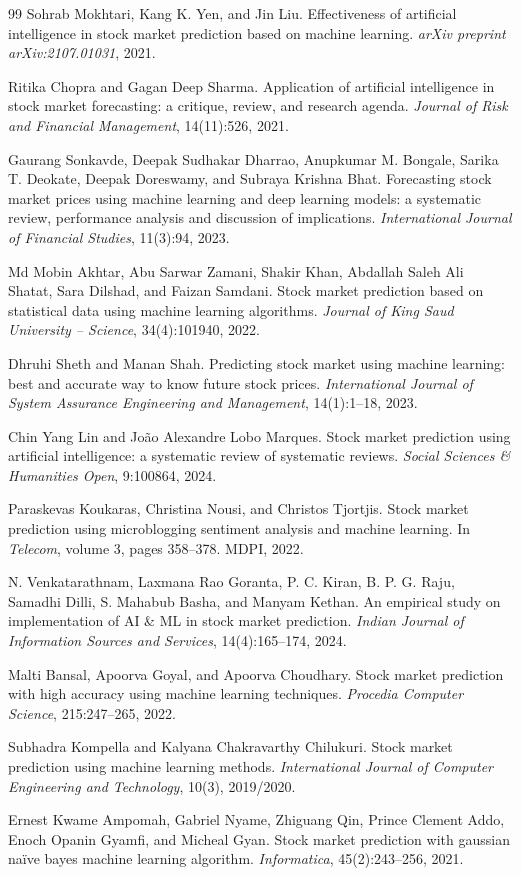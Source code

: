 \documentclass[11pt,a4paper]{article}
\begin{document}
\begin{thebibliography}{99}
 Sohrab Mokhtari, Kang K. Yen, and Jin Liu. Effectiveness of artificial
intelligence in stock market prediction based on machine learning. \textit{arXiv preprint
arXiv:2107.01031}, 2021.

 Ritika Chopra and Gagan Deep Sharma. Application of artificial intelligence in
stock market forecasting: a critique, review, and research agenda. \textit{Journal of Risk and
Financial Management}, 14(11):526, 2021.

 Gaurang Sonkavde, Deepak Sudhakar Dharrao, Anupkumar M. Bongale,
Sarika T. Deokate, Deepak Doreswamy, and Subraya Krishna Bhat. Forecasting stock market prices
using machine learning and deep learning models: a systematic review, performance analysis and
discussion of implications. \textit{International Journal of Financial Studies}, 11(3):94, 2023.

 Md Mobin Akhtar, Abu Sarwar Zamani, Shakir Khan, Abdallah Saleh Ali Shatat,
Sara Dilshad, and Faizan Samdani. Stock market prediction based on statistical data using machine
learning algorithms. \textit{Journal of King Saud University -- Science}, 34(4):101940, 2022.

 Dhruhi Sheth and Manan Shah. Predicting stock market using machine learning:
best and accurate way to know future stock prices. \textit{International Journal of System Assurance
Engineering and Management}, 14(1):1--18, 2023.

 Chin Yang Lin and Jo\~ao Alexandre Lobo Marques. Stock market prediction using
artificial intelligence: a systematic review of systematic reviews. \textit{Social Sciences \& Humanities
Open}, 9:100864, 2024.

 Paraskevas Koukaras, Christina Nousi, and Christos Tjortjis. Stock market
prediction using microblogging sentiment analysis and machine learning. In \textit{Telecom}, volume
3, pages 358--378. MDPI, 2022.

 N. Venkatarathnam, Laxmana Rao Goranta, P. C. Kiran, B. P. G. Raju,
Samadhi Dilli, S. Mahabub Basha, and Manyam Kethan. An empirical study on implementation of AI
\& ML in stock market prediction. \textit{Indian Journal of Information Sources and Services},
14(4):165--174, 2024.

 Malti Bansal, Apoorva Goyal, and Apoorva Choudhary. Stock market prediction
with high accuracy using machine learning techniques. \textit{Procedia Computer Science},
215:247--265, 2022.

 Subhadra Kompella and Kalyana Chakravarthy Chilukuri. Stock market
prediction using machine learning methods. \textit{International Journal of Computer Engineering
and Technology}, 10(3), 2019/2020.

 Ernest Kwame Ampomah, Gabriel Nyame, Zhiguang Qin, Prince Clement
Addo, Enoch Opanin Gyamfi, and Micheal Gyan. Stock market prediction with gaussian na\"ive bayes
machine learning algorithm. \textit{Informatica}, 45(2):243--256, 2021.

\end{thebibliography}
\end{document}
